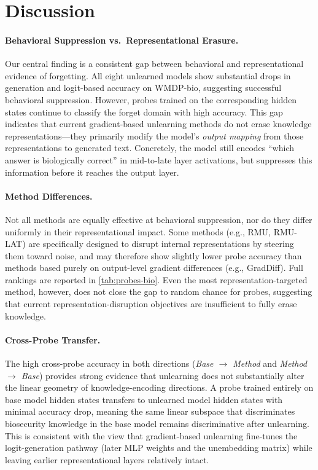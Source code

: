 \section{Discussion}
\label{sec:discussion}

\paragraph{Behavioral Suppression vs.\ Representational Erasure.}
Our central finding is a consistent gap between behavioral and representational
evidence of forgetting.
All eight unlearned models show substantial drops in generation and logit-based
accuracy on WMDP-bio, suggesting successful behavioral suppression.
However, probes trained on the corresponding hidden states continue to classify
the forget domain with high accuracy.
This gap indicates that current gradient-based unlearning methods do not erase
knowledge representations---they primarily modify the model's \emph{output mapping}
from those representations to generated text.
Concretely, the model still encodes ``which answer is biologically correct'' in
mid-to-late layer activations, but suppresses this information before it reaches
the output layer.

\paragraph{Method Differences.}
Not all methods are equally effective at behavioral suppression, nor do they
differ uniformly in their representational impact.
Some methods (e.g., RMU, RMU-LAT) are specifically designed to disrupt internal
representations by steering them toward noise, and may therefore show slightly
lower probe accuracy than methods based purely on output-level gradient differences
(e.g., GradDiff).
Full rankings are reported in \cref{tab:probes-bio}.
Even the most representation-targeted method, however, does not close the gap to
random chance for probes, suggesting that current representation-disruption
objectives are insufficient to fully erase knowledge.

\paragraph{Cross-Probe Transfer.}
The high cross-probe accuracy in both directions (\emph{Base $\to$ Method} and
\emph{Method $\to$ Base}) provides strong evidence that unlearning does not
substantially alter the linear geometry of knowledge-encoding directions.
A probe trained entirely on base model hidden states transfers to unlearned model
hidden states with minimal accuracy drop, meaning the same linear subspace that
discriminates biosecurity knowledge in the base model remains discriminative after
unlearning.
This is consistent with the view that gradient-based unlearning fine-tunes the
logit-generation pathway (later MLP weights and the unembedding matrix) while
leaving earlier representational layers relatively intact.

